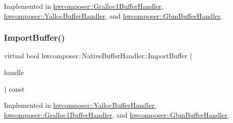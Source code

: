 Implemented in \mbox{\hyperlink{classhwcomposer_1_1Gralloc1BufferHandler_ad86921fa69dbb60b82581bd6f893decc}{hwcomposer\+::\+Gralloc1\+Buffer\+Handler}}, \mbox{\hyperlink{classhwcomposer_1_1YallocBufferHandler_a257b6f65f6c57915ecabb0b6ecd43237}{hwcomposer\+::\+Yalloc\+Buffer\+Handler}}, and \mbox{\hyperlink{classhwcomposer_1_1GbmBufferHandler_a55b6cac51fced2198ae9aee706d03452}{hwcomposer\+::\+Gbm\+Buffer\+Handler}}.

\mbox{\label{classhwcomposer_1_1NativeBufferHandler_a5841be467d2aa11e8c4d7233596fda3c}} 
\subsubsection{\texorpdfstring{Import\+Buffer()}{ImportBuffer()}}
{\footnotesize\ttfamily virtual bool hwcomposer\+::\+Native\+Buffer\+Handler\+::\+Import\+Buffer (\begin{DoxyParamCaption}\item[{\mbox{\hyperlink{alios_2platformdefines_8h_ac0a2eaf260f556d17fe489911f017bdf}{H\+W\+C\+Native\+Handle}}}]{handle }\end{DoxyParamCaption}) const\hspace{0.3cm}{\ttfamily [pure virtual]}}



Implemented in \mbox{\hyperlink{classhwcomposer_1_1YallocBufferHandler_aac23a7e72fca258da40cd033c78ccd02}{hwcomposer\+::\+Yalloc\+Buffer\+Handler}}, \mbox{\hyperlink{classhwcomposer_1_1Gralloc1BufferHandler_a0341cd413ba6e7d422edf30a161cd2b9}{hwcomposer\+::\+Gralloc1\+Buffer\+Handler}}, and \mbox{\hyperlink{classhwcomposer_1_1GbmBufferHandler_a552812693a793705e94138855daaead0}{hwcomposer\+::\+Gbm\+Buffer\+Handler}}.

\mbox{\label{classhwcomposer_1_1NativeBufferHandler_a4ef1e64030d28540265fac46d503e9b8}} 
